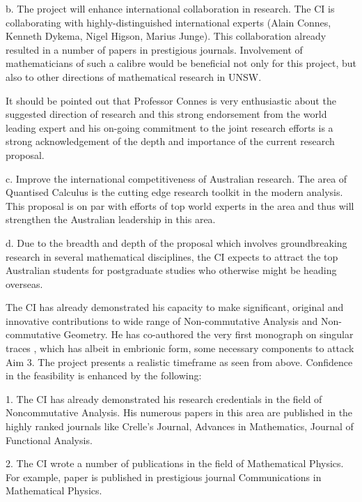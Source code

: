 \documentclass[12pt]{article}
\newcommand{\archeading}[1]{\vspace{.3cm} \noindent{\bfseries #1} \vspace{.1cm}   }
\begin{document}

b. The project will enhance international collaboration in research. The CI is collaborating with highly-distinguished international experts (Alain Connes, Kenneth Dykema, Nigel Higson, Marius Junge). This collaboration already resulted in a number of papers in prestigious journals. Involvement of mathematicians of such a calibre would be beneficial not only for this project, but also to other directions of mathematical research in UNSW.

It should be pointed out that Professor Connes is very enthusiastic about the suggested direction of research and this strong endorsement from the world leading expert and his on-going commitment to the joint research efforts is a strong acknowledgement of the depth and importance of the current research proposal.

c. Improve the international competitiveness of Australian research. The area of Quantised Calculus is the cutting edge research toolkit in the modern analysis. This proposal is on par with efforts of top world experts in the area and thus will strengthen the Australian leadership in this area.

d. Due to the breadth and depth of the proposal which involves groundbreaking research in several mathematical disciplines, the CI expects to attract the top Australian students for postgraduate studies who otherwise might be heading overseas.

\bigskip\archeading{Feasibility and Strategic Alignment}
The CI has already demonstrated his capacity to make significant, original and innovative contributions to wide range of Non-commutative Analysis and Non-commutative Geometry. He has co-authored the very first monograph on singular traces \cite{book}, which has albeit in embrionic form, some necessary components to attack Aim 3. The project presents a realistic timeframe as seen from above. Confidence in the feasibility is enhanced by the following:

1. The CI has already demonstrated his research credentials in the field of Noncommutative Analysis. His numerous papers in this area are published in the highly ranked journals like Crelle's Journal, Advances in Mathematics, Journal of Functional Analysis.

2. The CI wrote a number of publications in the field of Mathematical Physics. For example, paper \cite{SZ-cmp} is published in prestigious journal Communications in Mathematical Physics.
\end{document}
